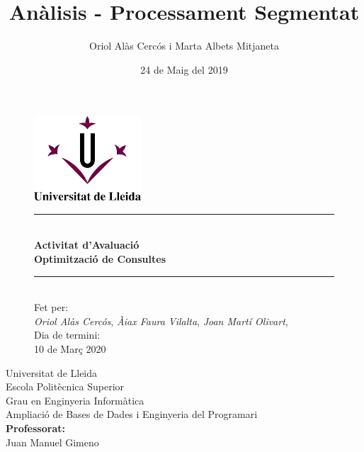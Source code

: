 \documentclass[12pt]{article}
\title{Anàlisis - Processament Segmentat}
\author{Oriol Alàs Cercós i Marta Albets Mitjaneta}
\date{24 de Maig del 2019}
\begin{document}
\begin{titlepage}
\begin{figure}[htb]
\begin{center}
	\includegraphics[width=4cm]{imgs/UDL.png}
   	\\
   	\medskip
   	\begin{center}
   		\noindent\rule{16.5cm}{0.4pt}
   		\linebreak 
   		\\
      	\Huge\textbf{Activitat d’Avaluació}
      	\\
      	\Large\textbf{Optimització de Consultes}
      	\noindent\rule{16.5cm}{0.4pt}
      	\\
      	\bigskip
      	\normalsize{Fet per:}
      	\\
      	\large\textit{Oriol Alàs Cercós},
      	\large\textit{Àiax Faura Vilalta},
      	\large\textit{Joan Martí Olivart},
      	\\
      	\setlength{\parskip}{1em}
      	\normalsize{Dia de termini:}
      	\\
      	\large{10 de Març 2020}
   	\end{center}
\end{center}
\end{figure}
\begin{flushright}
	Universitat de Lleida
	\\
	Escola Politècnica Superior
	\\
	Grau en Enginyeria Informàtica
	\\
	Ampliació de Bases de Dades i Enginyeria del Programari
	\\
	\medskip
	\textbf{Professorat:}
	\\
	Juan Manuel Gimeno
\end{flushright}
\thispagestyle{empty} 
\end{titlepage}
\tableofcontents
\thispagestyle{empty}
\newpage
\renewcommand*\listfigurename{Índex de figures}
\listoffigures
\thispagestyle{empty}

\newpage
\setcounter{page}{1}
%
\end{document}
